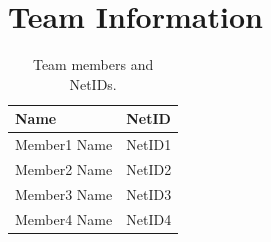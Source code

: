 \section{Team Information}

\begin{table}[H]
    \centering
    \caption{Team members and NetIDs.}
    \label{tab:team-info}
    \begin{tabular}{ll}
        \toprule
        \textbf{Name} & \textbf{NetID} \\
        \midrule
        Member1 Name & NetID1 \\
        Member2 Name & NetID2 \\
        Member3 Name & NetID3 \\
        Member4 Name & NetID4 \\
        \bottomrule
    \end{tabular}
\end{table}

